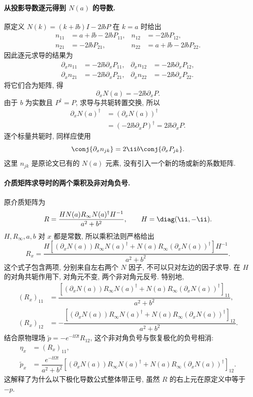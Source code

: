 \paragraph{从投影导数逐元得到 $N(a)$ 的导数.}
原定义 $N(k)=(k+\ii b)I-2\ii bP$ 在 $k=a$ 时给出
\begin{align*}
n_{11}&=a+\ii b-2\ii bP_{11},
&n_{12}&=-2\ii bP_{12},\\
n_{21}&=-2\ii bP_{21},
&n_{22}&=a+\ii b-2\ii bP_{22}.
\end{align*}
因此逐元求导的结果为
\begin{align*}
\partial_xn_{11}&=-2\ii b\partial_xP_{11},
&\partial_xn_{12}&=-2\ii b\partial_xP_{12},\\
\partial_xn_{21}&=-2\ii b\partial_xP_{21},
&\partial_xn_{22}&=-2\ii b\partial_xP_{22}.
\end{align*}
将它们合为矩阵, 得
\[
\partial_xN(a)=-2\ii b\partial_xP.
\]
由于 $b$ 为实数且 $P^\dagger=P$, 求导与共轭转置交换, 所以
\begin{align*}
\partial_xN(a)^\dagger
&=(\partial_xN(a))^\dagger\\
&=(-2\ii b\partial_xP)^\dagger
=2\ii b\partial_xP.
\end{align*}
逐个标量共轭时, 同样应使用
\[
\conj{\partial_xn_{jk}}
=2\ii b\conj{\partial_xP_{jk}}.
\]
这里 $n_{jk}$ 是原论文已有的 $N(a)$ 元素, 没有引入一个新的场或新的系数矩阵.

\paragraph{介质矩阵求导时的两个乘积及非对角负号.}
原介质矩阵为
\[
R=\dfrac{HN(a)R_\infty N(a)^\dagger H^{-1}}{a^2+b^2},
\qquad H=\diag(\ii,-\ii).
\]
$H,R_\infty,a,b$ 对 $x$ 都是常数, 所以乘积法则严格给出
\[
R_x=\dfrac{H\left[
(\partial_xN(a))R_\infty N(a)^\dagger
+N(a)R_\infty(\partial_xN(a))^\dagger
\right]H^{-1}}{a^2+b^2}.
\]
这个式子包含两项, 分别来自左右两个 $N$ 因子, 不可以只对左边的因子求导. 在 $H$ 的对角共轭作用下, 对角元不变, 两个非对角元反号. 特别地,
\begin{align*}
(R_x)_{11}
&=\dfrac{\left[
(\partial_xN(a))R_\infty N(a)^\dagger
+N(a)R_\infty(\partial_xN(a))^\dagger
\right]_{11}}{a^2+b^2},\\
(R_x)_{12}
&=-\dfrac{\left[
(\partial_xN(a))R_\infty N(a)^\dagger
+N(a)R_\infty(\partial_xN(a))^\dagger
\right]_{12}}{a^2+b^2}.
\end{align*}
结合原物理场 $\widetilde p=-e^{-\ii\Omega t}R_{12}$, 这个非对角负号与恢复极化的负号相消:
\begin{align*}
\eta_x&=(R_x)_{11},\\
\widetilde p_x
&=\dfrac{e^{-\ii\Omega t}}{a^2+b^2}
\left[
(\partial_xN(a))R_\infty N(a)^\dagger
+N(a)R_\infty(\partial_xN(a))^\dagger
\right]_{12}.
\end{align*}
这解释了为什么以下极化导数公式整体带正号, 虽然 $R$ 的右上元在原定义中等于 $-p$.

